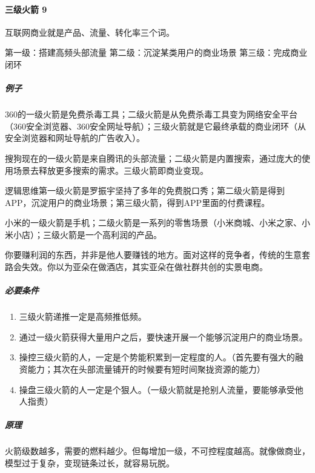 \documentclass[letterpaper,11pt,english]{sphinxmanual}
\begin{document}
\paragraph{三级火箭 9\sphinxfootnotemark[126]}
\label{\detokenize{chapter_idea/business:id17}}%
\begin{footnotetext}[126]\sphinxAtStartFootnote
{}
%
\end{footnotetext}\ignorespaces 
互联网商业就是产品、流量、转化率三个词。

第一级：搭建高频头部流量 第二级：沉淀某类用户的商业场景
第三级：完成商业闭环


\subparagraph{例子}
\label{\detokenize{chapter_idea/business:id18}}
360的一级火箭是免费杀毒工具；二级火箭是从免费杀毒工具变为网络安全平台（360安全浏览器、360安全网址导航）；三级火箭就是它最终承载的商业闭环（从安全浏览器和网址导航的广告收入）。

搜狗现在的一级火箭是来自腾讯的头部流量；二级火箭是内置搜索，通过庞大的使用场景去释放更多搜索的需求。三级火箭即商业变现。

逻辑思维第一级火箭是罗振宇坚持了多年的免费脱口秀；第二级火箭是得到APP，沉淀用户的商业场景；第三级火箭，得到APP里面的付费课程。

小米的一级火箭是手机；二级火箭是一系列的零售场景（小米商城、小米之家、小米小店）；三级火箭是一个高利润的产品。

你要赚利润的东西，并非是他人要赚钱的地方。面对这样的竞争者，传统的生意套路会失效。你以为亚朵在做酒店，其实亚朵在做社群共创的实景电商。


\subparagraph{必要条件}
\label{\detokenize{chapter_idea/business:id19}}\begin{enumerate}
%
\item {} 
三级火箭递推一定是高频推低频。

\item {} 
通过一级火箭获得大量用户之后，要快速开展一个能够沉淀用户的商业场景。

\item {} 
操控三级火箭的人，一定是个势能积累到一定程度的人。（首先要有强大的融资能力；其次在头部流量铺开的时候要有短时间聚拢资源的能力）

\item {} 
操盘三级火箭的人一定是个狠人。（一级火箭就是抢别人流量，要能够承受他人指责）

\end{enumerate}


\subparagraph{原理}
\label{\detokenize{chapter_idea/business:id20}}
火箭级数越多，需要的燃料越少。但每增加一级，不可控程度越高。就像做商业，模型过于复杂，变现链条过长，就容易玩脱。
\end{document}
